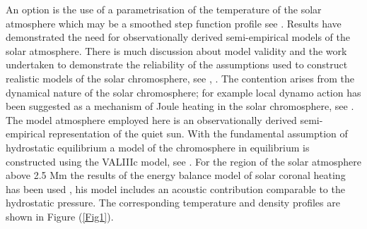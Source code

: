 \documentclass[preprint,authoryear,12pt]{elsarticle}
\begin{document}
An option is the use of a parametrisation of the temperature of the solar atmosphere which may be a smoothed step 
function profile see \citet{Murawski2010}. Results have demonstrated the need for observationally derived semi-empirical 
models of the solar atmosphere. There is much discussion about model validity and the work undertaken to 
demonstrate the reliability of the assumptions used to construct realistic models of the solar chromosphere, see \citet{Carlsson1995}, \citet{Kalkofen2012}. The contention arises from the dynamical nature of the solar chromosphere; for example local dynamo action has been suggested as a mechanism of Joule heating in the solar chromosphere, see \citet{Leenaarts2011}. The model atmosphere employed here is an observationally derived semi-empirical representation of the quiet sun. With the fundamental assumption of hydrostatic equilibrium a model of the chromosphere in equilibrium is constructed using the VALIIIc model, see \citet{Vernazza1981}. For the region of the solar atmosphere above 2.5 Mm the results of the energy balance model of solar coronal heating has been used \citep[see][]{McWhirter1975}, his model includes an acoustic contribution comparable to the hydrostatic pressure. The corresponding temperature and density profiles are shown in Figure (\ref{Fig1}).
\end{document}

